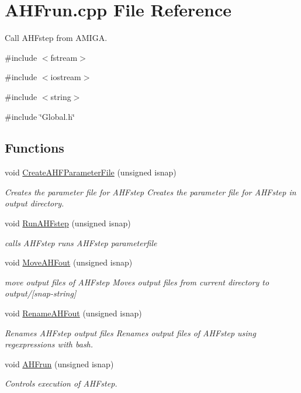 \section{AHFrun.cpp File Reference}
\label{AHFrun_8cpp}


Call AHFstep from AMIGA.  


{\ttfamily \#include $<$fstream$>$}\par
{\ttfamily \#include $<$iostream$>$}\par
{\ttfamily \#include $<$string$>$}\par
{\ttfamily \#include \char`\"{}Global.h\char`\"{}}\par
\subsection*{Functions}
\begin{DoxyCompactItemize}
\item 
void \hyperlink{AHFrun_8cpp_a498c71a5b2c0c5e91a49eefbec7bde28}{CreateAHFParameterFile} (unsigned isnap)
\begin{DoxyCompactList}\small\item\em Creates the parameter file for AHFstep Creates the parameter file for AHFstep in output directory. \item\end{DoxyCompactList}\item 
void \hyperlink{AHFrun_8cpp_a18d1ee9bcd4bd82bd3723ad782f96baa}{RunAHFstep} (unsigned isnap)
\begin{DoxyCompactList}\small\item\em calls AHFstep runs AHFstep parameterfile \item\end{DoxyCompactList}\item 
void \hyperlink{AHFrun_8cpp_a0c1b81f14fbaf2f91b492b88c22048f2}{MoveAHFout} (unsigned isnap)
\begin{DoxyCompactList}\small\item\em move output files of AHFstep Moves output files from current directory to output/\mbox{[}snap-\/string\mbox{]} \item\end{DoxyCompactList}\item 
void \hyperlink{AHFrun_8cpp_aa08053728ff6ed1133954df327e4fb7a}{RenameAHFout} (unsigned isnap)
\begin{DoxyCompactList}\small\item\em Renames AHFstep output files Renames output files of AHFstep using regexpressions with bash. \item\end{DoxyCompactList}\item 
void \hyperlink{AHFrun_8cpp_a4dfcaa53f6208d77814e562b7dab7d94}{AHFrun} (unsigned isnap)
\begin{DoxyCompactList}\small\item\em Controls execution of AHFstep. \item\end{DoxyCompactList}\end{DoxyCompactItemize}


